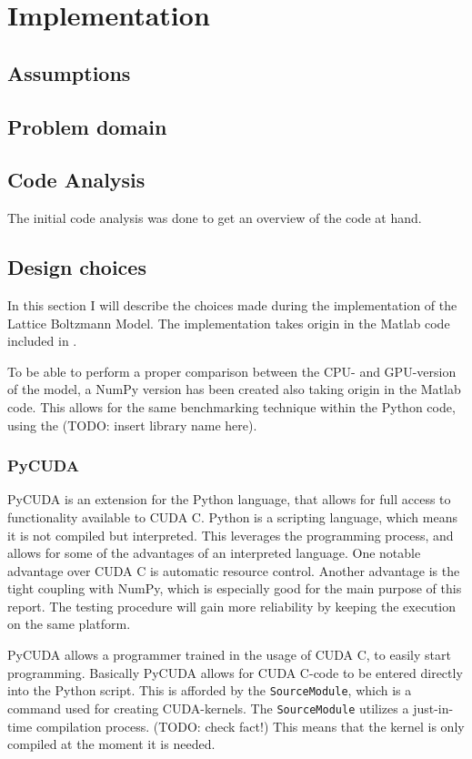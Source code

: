 \section{Implementation}

\subsection{Assumptions}

\subsection{Problem domain}

\subsection{Code Analysis}
The initial code analysis was done to get an overview of the code at hand.

\subsection{Design choices}
In this section I will describe the choices made during the implementation of the Lattice Boltzmann Model. The implementation takes origin in the Matlab code included in .

To be able to perform a proper comparison between the CPU- and GPU-version of the model, a NumPy version has been created also taking origin in the Matlab code. This allows for the same benchmarking technique within the Python code, using the (TODO: insert library name here).

\subsubsection{PyCUDA}
PyCUDA is an extension for the Python language, that allows for full access to functionality available to CUDA C. Python is a scripting language, which means it is not compiled but interpreted. This leverages the programming process, and allows for some of the advantages of an interpreted language. One notable advantage over CUDA C is automatic resource control. Another advantage is the tight coupling with NumPy, which is especially good for the main purpose of this report. The testing procedure will gain more reliability by keeping the execution on the same platform.

PyCUDA allows a programmer trained in the usage of CUDA C, to easily start programming. Basically PyCUDA allows for CUDA C-code to be entered directly into the Python script. This is afforded by the \texttt{SourceModule}, which is a command used for creating CUDA-kernels. The \texttt{SourceModule} utilizes a just-in-time compilation process. (TODO: check fact!) This means that the kernel is only compiled at the moment it is needed.

